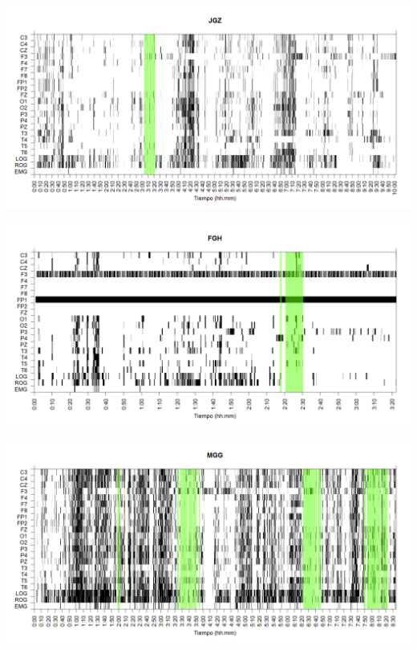 
\begin{SidewaysFigure}
\centering
\includegraphics[width=\linewidth]
{./grafiquitos170404/JGMN6SUE_est.png} 
\caption{Sujeto: JGZ | Total \'epocas: 1207 | \'Epocas MOR: 33
}
\label{JGZ}
\end{SidewaysFigure}


\begin{SidewaysFigure}
\centering
\includegraphics[width=\linewidth]
{./grafiquitos170404/FGHSUE_est.png} 
\caption{Sujeto: FGH | Total \'epocas: 405 | \'Epocas MOR: 22
}
\label{FGH}
\end{SidewaysFigure}


\begin{SidewaysFigure}
\centering
\includegraphics[width=\linewidth]
{./grafiquitos170404/MGNA5SUE_est.png} 
\caption{Sujeto: MGG | Total \'epocas: 1030 | \'Epocas MOR: 166
}
\label{MGG}
\end{SidewaysFigure}

